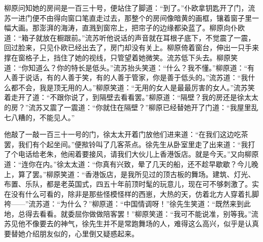 \par 柳原问知她的房间是一百三十号，便站住了脚道：“到了。”仆欧拿钥匙开了门，流苏一进门便不由得向窗口笔直走过去，那整个的房间像暗黄的画框，镶着窗子里一幅大画。那澎湃的海涛，直溅到窗帘上，把帘子的边缘都染蓝了。柳原向仆欧道：“箱子就放在橱跟前。”流苏听他说话的声音就在耳根子底下，不觉震了一震，回过脸来，只见仆欧已经出去了，房门却没有关上。柳原倚着窗台，伸出一只手来撑在窗格子上，挡住了她的视线，只管望着她微笑。流苏低下头去。柳原笑道：“你知道么？你的特长是低头。”流苏抬头笑道：“什么？我不懂。”柳原道：“有人善于说话，有的人善于笑，有的人善于管家，你是善于低头的。”流苏道：“我什么都不会，我是顶无用的人。”柳原笑道：“无用的女人是最最厉害的女人。”流苏笑着走开了道：“不跟你说了，到隔壁去看看罢。”柳原道：“隔壁？我的房还是徐太太的房？”流苏又震了一震道：“你就住在隔壁？”柳原已经替她开了门道：“我屋里乱七八糟的，不能见人。”
\par 他敲了一敲一百三十一号的门，徐太太开着门放他们进来道：“在我们这边吃茶罢，我们有个起坐间。”便揿铃叫了几客茶点。徐先生从卧室里走了出来道：“我打了个电话给老朱，他闹着要接风，请我们大伙儿上香港饭店。就是今天。”又向柳原道：“连你在内。”徐太太道：“你真有兴致，晕了几天的船，还不趁早歇歇？今儿晚上，算了罢。”柳原笑道：“香港饭店，是我所见过的顶古板的舞场。建筑、灯光、布置、乐队，都是老英国式，四五十年前顶时髦的玩意儿，现在可不够刺激了。实在没有什么可看的，除非是那些怪模怪样的西崽，大热的天，仿着北方人穿着扎脚袴——”流苏道：“为什么？”柳原道：“中国情调呀！”徐先生笑道：“既然来到此地，总得去看看。就委屈你做做陪客罢！”柳原笑道：“我可不能说准，别等我。”流苏见他不像要去的神气，徐先生并不是常跑舞场的人，难得这么高兴，似乎是认真要替她介绍朋友似的，心里倒又疑惑起来。
